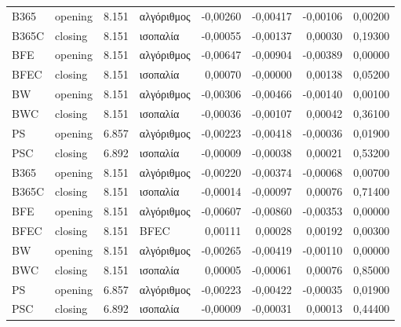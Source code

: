{\begin{longtable}{@{}llrlrrrr@{}}
B365 & opening & 8.151 & αλγόριθμος & -0,00260 & -0,00417 & -0,00106 & 0,00200 \\
B365C & closing & 8.151 & ισοπαλία & -0,00055 & -0,00137 & 0,00030 & 0,19300 \\
BFE & opening & 8.151 & αλγόριθμος & -0,00647 & -0,00904 & -0,00389 & 0,00000 \\
BFEC & closing & 8.151 & ισοπαλία & 0,00070 & -0,00000 & 0,00138 & 0,05200 \\
BW & opening & 8.151 & αλγόριθμος & -0,00306 & -0,00466 & -0,00140 & 0,00100 \\
BWC & closing & 8.151 & ισοπαλία & -0,00036 & -0,00107 & 0,00042 & 0,36100 \\
PS & opening & 6.857 & αλγόριθμος & -0,00223 & -0,00418 & -0,00036 & 0,01900 \\
PSC & closing & 6.892 & ισοπαλία & -0,00009 & -0,00038 & 0,00021 & 0,53200 \\
B365 & opening & 8.151 & αλγόριθμος & -0,00220 & -0,00374 & -0,00068 & 0,00700 \\
B365C & closing & 8.151 & ισοπαλία & -0,00014 & -0,00097 & 0,00076 & 0,71400 \\
BFE & opening & 8.151 & αλγόριθμος & -0,00607 & -0,00860 & -0,00353 & 0,00000 \\
BFEC & closing & 8.151 & BFEC & 0,00111 & 0,00028 & 0,00192 & 0,00300 \\
BW & opening & 8.151 & αλγόριθμος & -0,00265 & -0,00419 & -0,00110 & 0,00000 \\
BWC & closing & 8.151 & ισοπαλία & 0,00005 & -0,00061 & 0,00076 & 0,85000 \\
PS & opening & 6.857 & αλγόριθμος & -0,00223 & -0,00422 & -0,00035 & 0,01900 \\
PSC & closing & 6.892 & ισοπαλία & -0,00009 & -0,00031 & 0,00013 & 0,44400 \\
\end{longtable}
}

